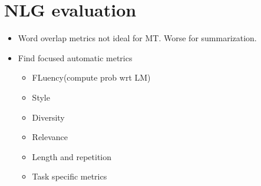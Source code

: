 \documentclass[a4paper]{article}
\begin{document}
\section{NLG evaluation}
\begin{itemize}
    \item Word overlap metrics not ideal for MT. Worse for summarization.
    \item Find focused automatic metrics
    \begin{itemize}
        \item FLuency(compute prob wrt LM)
        \item Style
        \item Diversity
        \item Relevance
        \item Length and repetition
        \item Task specific metrics
    \end{itemize}
\end{itemize}
\end{document}
